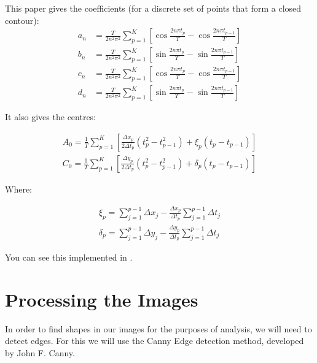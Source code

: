 \documentclass[12pt,english]{article}
\begin{document}
\be

This paper gives the coefficients (for a discrete set of points that form a closed contour):
\begin{equation}
\begin{aligned}
	a_n&=\frac{T}{2n^2\pi^2}\sum_{p=1}^{K}\left[\cos\frac{2n\pi t_p}{T}-\cos\frac{2n\pi t_{p-1}}{T}\right] \\
	b_n&=\frac{T}{2n^2\pi^2}\sum_{p=1}^{K}\left[\sin\frac{2n\pi t_p}{T}-\sin\frac{2n\pi t_{p-1}}{T}\right] \\
	c_n&=\frac{T}{2n^2\pi^2}\sum_{p=1}^{K}\left[\cos\frac{2n\pi t_p}{T}-\cos\frac{2n\pi t_{p-1}}{T}\right] \\
	d_n&=\frac{T}{2n^2\pi^2}\sum_{p=1}^{K}\left[\sin\frac{2n\pi t_p}{T}-\sin\frac{2n\pi t_{p-1}}{T}\right]
\end{aligned}
\end{equation}

It also gives the centres:

\begin{equation}
\begin{aligned}
	A_0 = \frac{1}{T}\sum_{p=1}^{K}\left[\frac{\Delta x_p}{2\Delta t_p}\left(t_p^2-t_{p-1}^2\right)+\xi_p\left(t_p-t_{p-1}\right) \right]\\
	C_0 = \frac{1}{T}\sum_{p=1}^{K}\left[\frac{\Delta y_p}{2\Delta t_p}\left(t_p^2-t_{p-1}^2\right)+\delta_p\left(t_p-t_{p-1}\right) \right]
\end{aligned}
\end{equation}

Where:

\begin{equation}
\begin{aligned}
	\xi_p = \sum_{j=1}^{p-1}\Delta x_j-\frac{\Delta x_p}{\Delta t_p}\sum_{j=1}^{p-1}\Delta t_j \\
	\delta_p = \sum_{j=1}^{p-1}\Delta y_j-\frac{\Delta y_p}{\Delta t_p}\sum_{j=1}^{p-1}\Delta t_j
\end{aligned}
\end{equation}

You can see this implemented in .

\section{Processing the Images}
In order to find shapes in our images for the purposes of analysis,
we will need to detect edges. For this we will use the Canny Edge
detection method, developed by John F. Canny.
\end{document}
